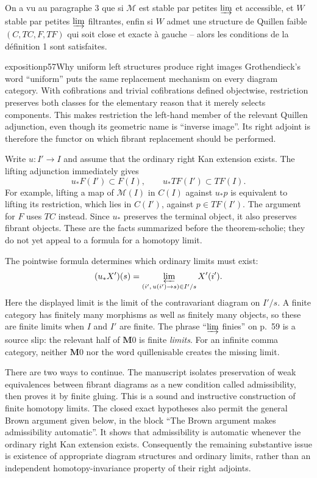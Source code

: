 On a vu au paragraphe 3 que si $\mathcal{M}$ est stable par petites $\varinjlim$ et accessible, et $W$ stable par petites $\varinjlim$ filtrantes, enfin si
$W$ admet une structure de Quillen faible $(C,TC,F,TF)$ qui soit close et exacte à gauche -- alors les conditions de la définition 1 sont satisfaites.

\begin{dcomment}{exposition}{p57}{Why uniform left structures produce right images}
Grothendieck's word ``uniform'' puts the same replacement mechanism on every diagram category. With cofibrations and trivial cofibrations defined objectwise, restriction preserves both classes for the elementary reason that it merely selects components. This makes restriction the left-hand member of the relevant Quillen adjunction, even though its geometric name is ``inverse image''. Its right adjoint is therefore the functor on which fibrant replacement should be performed.

Write $u:I'\to I$ and assume that the ordinary right Kan extension exists. The lifting adjunction immediately gives
\[
 u_*F(I')\subset F(I),\qquad u_*TF(I')\subset TF(I).
\]
For example, lifting a map of $\mathcal M(I)$ in $C(I)$ against $u_*p$ is equivalent to lifting its restriction, which lies in $C(I')$, against $p\in TF(I')$. The argument for $F$ uses $TC$ instead. Since $u_*$ preserves the terminal object, it also preserves fibrant objects. These are the facts summarized before the theorem-scholie; they do not yet appeal to a formula for a homotopy limit.

The pointwise formula determines which ordinary limits must exist:
\[
 (u_*X')(s)=\varprojlim_{(i',\,u(i')\to s)\in I'/s}X'(i').
\]
Here the displayed limit is the limit of the contravariant diagram on $I'/s$. A finite category has finitely many morphisms as well as finitely many objects, so these are finite limits when $I$ and $I'$ are finite. The phrase ``$\varinjlim$ finies'' on p.~59 is a source slip: the relevant half of $\mathbf M0$ is finite \emph{limits}. For an infinite comma category, neither $\mathbf M0$ nor the word quillenisable creates the missing limit.

There are two ways to continue. The manuscript isolates preservation of weak equivalences between fibrant diagrams as a new condition called admissibility, then proves it by finite gluing. This is a sound and instructive construction of finite homotopy limits. The closed exact hypotheses also permit the general Brown argument given below, in the block ``The Brown argument makes admissibility automatic''. It shows that admissibility is automatic whenever the ordinary right Kan extension exists. Consequently the remaining substantive issue is existence of appropriate diagram structures and ordinary limits, rather than an independent homotopy-invariance property of their right adjoints.


\end{dcomment}
